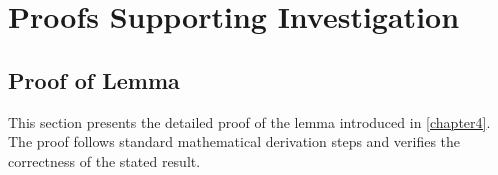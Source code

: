 \appendix
\chapter{Proofs Supporting Investigation}
\label{appendix}

\section{Proof of Lemma}
\begin{paragraph}
This section presents the detailed proof of the lemma introduced in \autoref{chapter4}. The proof follows standard mathematical derivation steps and verifies the correctness of the stated result.
\end{paragraph}

